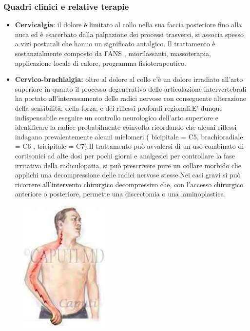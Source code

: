 \subsubsection{Quadri clinici e relative terapie}

\begin{itemize}
\item
  \textbf{Cervicalgia}: il dolore è limitato al collo nella sua faccia posteriore fino alla nuca ed è esacerbato dalla palpazione dei processi trasversi, si associa spesso a vizi posturali che hanno un significato antalgico. Il trattamento è sostanzialmente composto da FANS , miorilassanti, massoterapia, applicazione locale di calore, programma fisioterapeutico.
\item
  \textbf{Cervico-brachialgia:} oltre al dolore al collo c'è un dolore irradiato all'arto superiore in quanto il processo degenerativo delle articolazione intervertebrali ha portato all'interessamento delle radici nervose con conseguente alterazione della sensibilità, della forza, e dei riflessi profondi regionali.E' dunque indispensabile eseguire un controllo neurologico dell'arto superiore e identificare la radice probabilmente coinvolta ricordando che alcuni riflessi indagano prevalentemente alcuni mielomeri ( bicipitale = C5, brachioradiale = C6 , tricipitale = C7).Il trattamento può avvalersi di un uso combinato di cortisonici ad alte dosi per pochi giorni e analgesici per controllare la fase irritativa della radiculopatia, si può prescrivere pure un collare morbido che applichi una decompressione delle radici nervose stesse.Nei casi gravi si può ricorrere all'intervento chirurgico decompressivo che, con l'accesso chirurgico anteriore o posteriore, permette una discectomia o una laminoplastica.
\end{itemize}

\begin{figure}[!ht]
\centering
\includegraphics[width=0.4\textwidth]{020/image4.png}
\end{figure}

